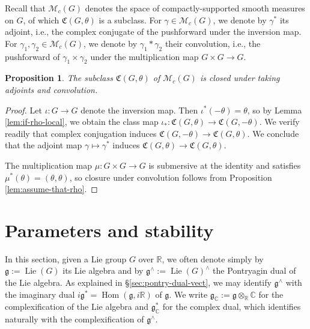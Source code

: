 \documentclass[reqno]{amsart}
\DeclareMathOperator{\Hom}{Hom}
\DeclareMathOperator{\Lie}{Lie}
\theoremstyle{plain} \newtheorem{theorem} {Theorem}
\newtheorem{proposition} [theorem] {Proposition}
\theoremstyle{definition} \newtheorem{definition} [theorem] {Definition}
\theoremstyle{itplain} %
\numberwithin{equation}{section}
\numberwithin{theorem}{section}
\begin{document}
Recall that $\mathcal{M}_c(G)$ denotes the space of compactly-supported smooth measures on $G$, of which $\mathfrak{C}(G,\theta)$ is a subclass.  For $\gamma \in \mathcal{M}_c(G)$, we denote by $\gamma^*$ its adjoint, i.e., the complex conjugate of the pushforward under the inversion map.  For $\gamma_1, \gamma_2 \in \mathcal{M}_c(G)$, we denote by $\gamma_1 \ast \gamma_2$ their convolution, i.e., the pushforward of $\gamma_1 \times \gamma_2$ under the multiplication map $G \times G \rightarrow G$.
\begin{proposition}\label{lem:standard:subcl-mathfr-theta}
  The subclass $\mathfrak{C}(G,\theta)$ of $\mathcal{M}_c(G)$ is closed under taking adjoints and convolution.
\end{proposition}
\begin{proof}
  Let $\iota : G \rightarrow G$ denote the inversion map.  Then $\iota^*(-\theta) = \theta$, so by Lemma \ref{lem:if-rho-local}, we obtain the class map $\iota_* : \mathfrak{C}(G,\theta) \rightarrow \mathfrak{C}(G,-\theta)$.  We verify readily that complex conjugation induces $\mathfrak{C}(G,-\theta) \rightarrow \mathfrak{C}(G,\theta)$.  We conclude that the adjoint map $\gamma \mapsto \gamma^*$ induces $\mathfrak{C}(G,\theta) \rightarrow \mathfrak{C}(G,\theta)$.

  The multiplication map $\mu : G \times G \rightarrow G$ is submersive at the identity and satisfies $\mu^*(\theta) = (\theta,\theta)$, so closure under convolution follows from Proposition \ref{lem:assume-that-rho}.
\end{proof}



\section{Parameters and stability}\label{sec:parameters-stability}
In this section, given a Lie group $G$ over $\mathbb{R}$, we often denote simply by $\mathfrak{g} := \Lie(G)$ its Lie algebra and by $\mathfrak{g}^\wedge := \Lie(G)^\wedge$ the Pontryagin dual of the Lie algebra.  As explained in \S\ref{sec:pontry-dual-vect}, we may identify $\mathfrak{g}^\wedge$ with the imaginary dual $i \mathfrak{g}^* = \Hom(\mathfrak{g}, i \mathbb{R})$ of $\mathfrak{g}$.  We write $\mathfrak{g}_\mathbb{C} := \mathfrak{g}\otimes_{\mathbb{R}} \mathbb{C}$ for the complexification of the Lie algebra and $\mathfrak{g}_\mathbb{C}^*$ for the complex dual, which identifies naturally with the complexification of $\mathfrak{g}^\wedge$.
\end{document}
